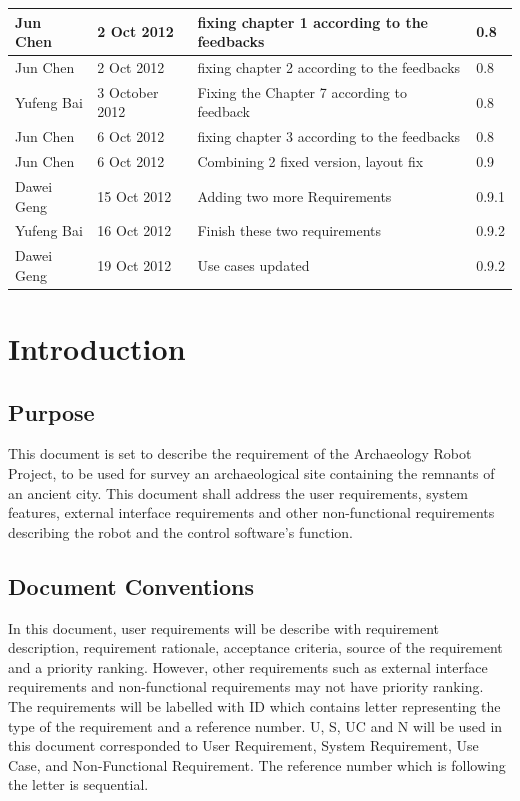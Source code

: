\documentclass[11pt, a4paper]{report}
\begin{document}
\begin{tabular}{| l | l | l | l | }
Jun Chen	                &	2 Oct 2012		    &	fixing chapter 1 according to the feedbacks			&	0.8				\\ \hline
Jun Chen	                &	2 Oct 2012		    &	fixing chapter 2 according to the feedbacks			&	0.8 			\\ \hline
Yufeng Bai	                &	3 October 2012	    &	Fixing the Chapter 7 according to feedback	       	&	0.8				\\ \hline
Jun Chen	                &	6 Oct 2012	        &	fixing chapter 3 according to the feedbacks			&	0.8 			\\ \hline
Jun Chen	                &	6 Oct 2012	        &	Combining 2 fixed version, layout fix			    &	0.9 			\\ \hline
Dawei Geng                  & 15 Oct 2012           & Adding two more Requirements                          &   0.9.1       	\\ \hline
Yufeng Bai					&	16 Oct 2012			& Finish these two requirements							&	0.9.2			\\ \hline
Dawei Geng					&	19 Oct 2012			& Use cases updated										&	0.9.2			\\ \hline



\end{tabular}
\clearpage


\chapter{Introduction}

\section{Purpose}
This document is set to describe the requirement of the Archaeology Robot Project, to be used for survey an archaeological site containing the remnants of an ancient city. This document shall address the user requirements, system features, external interface requirements and other non-functional requirements describing the robot and the control software's function. 


\section{Document Conventions}
In this document, user requirements will be describe with requirement description, requirement rationale, acceptance criteria, source of the requirement and a priority ranking. However, other requirements such as external interface requirements and non-functional requirements may not have priority ranking. 
The requirements will be labelled with ID which contains letter representing the type of the requirement and a reference number. U, S, UC and N will be used in this document corresponded to User Requirement, System Requirement, Use Case, and Non-Functional Requirement.  The reference number which is following the letter is sequential.
\end{document}
